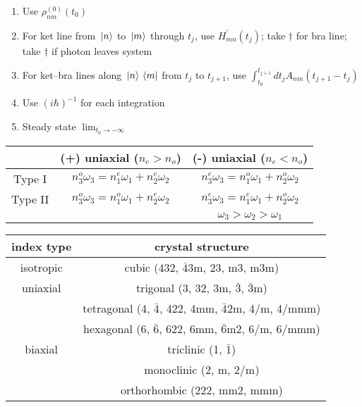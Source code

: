 \documentclass[12pt]{article}
\begin{document}
\begin{multicols}{2}
  \begin{enumerate}
  \item Use $\rho^{(0)}_{nm}(t_0)$
  \item For ket line from $\ket*{n}$ to $\ket*{m}$ through $t_j$, use $H_{mn}^{\prime}(t_j)$; take $\dagger$ for bra line;
    take $\dagger$ if photon leaves system
  \item For ket--bra lines along $\ket*{n}\bra*{m}$ from $t_j$ to $t_{j + 1}$, use $\int_{t_0}^{t_{j+1}} dt_j A_{nm}(t_{j + 1} - t_j)$
  \item Use $(i\hbar)^{-1}$ for each integration
  \item Steady state $\lim_{t_0 \rightarrow -\infty}$
  \end{enumerate}
  
\end{multicols}

\begin{table}
  \begin{tabular}{c|c|c}
    &(+) uniaxial ($n_e > n_o$)& (-) uniaxial ($n_e < n_o$)\\
    \hline
    Type I & $n_3^o \omega_3 = n_1^e \omega_1 + n_2^e \omega_2$ & $n_3^e \omega_3 = n_1^o \omega_1 + n_2^o \omega_2$\\
    Type II & $n_3^o \omega_3 = n_1^o \omega_1 + n_2^e \omega_2$ & $n_3^e \omega_3 = n_1^e \omega_1 + n_2^o \omega_2$\\
    && $\omega_3 > \omega_2 > \omega_1$\\
  \end{tabular}
\end{table}


\begin{table}
  \begin{tabular}{c|c}
    index type & crystal structure\\
    \hline
    isotropic & cubic (432, $\bar{4}$3m, 23, m3, m3m)\\
    \hline
    uniaxial & trigonal (3, 32, 3m, $\bar{3}$, $\bar{3}$m)\\
    & tetragonal (4, $\bar{4}$, 422, 4mm, $\bar{4}$2m, 4/m, 4/mmm)\\
    & hexagonal (6, $\bar{6}$, 622, 6mm, $\bar{6}$m2, 6/m, 6/mmm)\\
    \hline
    biaxial & triclinic (1, $\bar{1}$)\\
    & monoclinic (2, m, 2/m)\\
    & orthorhombic (222, mm2, mmm)\\
  \end{tabular} %
\end{table}
\end{document}
